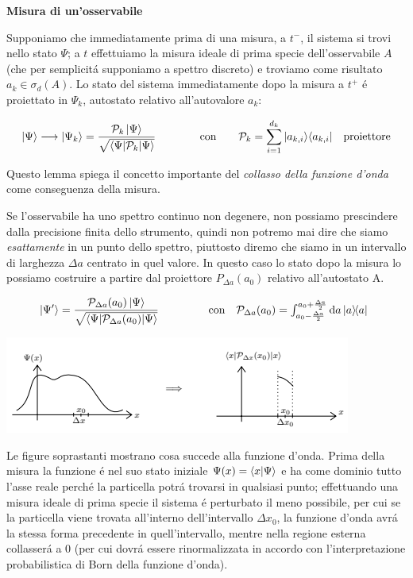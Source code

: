 \begin{postulato} \textbf{Misura di un'osservabile}

Supponiamo che immediatamente prima di una misura, a $t^-$, il sistema si trovi nello stato $\Psi$; a $t$ effettuiamo la misura ideale di prima specie dell'osservabile $A$ (che per semplicit\'a supponiamo a spettro discreto) e troviamo come risultato $a_k \in \sigma_{d}(A)$. Lo stato del sistema immediatamente dopo la misura a $t^+$ \'e proiettato in $\Psi_k$, autostato relativo all'autovalore $a_k$:

$$|\Psi\rangle\longrightarrow|\Psi_{k}\rangle=\frac{{\mathcal{P}}_{k}\,|\Psi\rangle}{\sqrt{\left\langle\Psi|{\mathcal{P}}_{k}|\Psi\right\rangle}} \qquad\qquad \text{con} \qquad \mathcal{P}_k = \sum_{i=1}^{d_k} \ket{a_{k,i}} \bra{a_{k,i}} \quad \text{proiettore}$$
\end{postulato}

Questo lemma spiega il concetto importante del \textit{collasso della funzione d'onda} come conseguenza della misura.

Se l'osservabile ha uno spettro continuo non degenere, non possiamo prescindere dalla precisione finita dello strumento, quindi non potremo mai dire che siamo \textit{esattamente} in un punto dello spettro, piuttosto diremo che siamo in un intervallo di larghezza $\Delta a$ centrato in quel valore. In questo caso lo stato dopo la misura lo possiamo costruire a partire dal proiettore $P_{\Delta a}(a_0)$ relativo all'autostato A.

$$\ket{\Psi^\prime} = \frac{{\mathcal{P}}_{\Delta a}(a_{0})\,|\Psi\rangle}{\sqrt{\left\langle\Psi|{\mathcal{P}}_{\Delta a}(a_{0})|\Psi\right\rangle}} \qquad\qquad \begin{array}{r l}\text{con}&{{}{\mathcal{P}}_{\Delta a}(a_{0})=\int_{a_{0}-{\frac{\Delta a}{2}}}^{a_{0}+{\frac{\Delta a}{2}}}\mathrm{d}a\,|a\rangle\!\langle a|}\end{array}$$
	
\begin{center}
	\includegraphics{immagini/19_image_2.png}
\end{center}
	
Le figure soprastanti mostrano cosa succede alla funzione d'onda. Prima della misura la funzione \'e nel suo stato iniziale $\Psi(x) = \braket{x}{\Psi}$ e ha come dominio tutto l'asse reale perch\'e la particella potr\'a trovarsi in qualsiasi punto; effettuando una misura ideale di prima specie il sistema \'e perturbato il meno possibile, per cui se la particella viene trovata all'interno dell'intervallo $\Delta x_0$, la funzione d'onda avr\'a la stessa forma precedente in quell'intervallo, mentre nella regione esterna collasser\'a a 0 (per cui dovr\'a essere rinormalizzata in accordo con l'interpretazione probabilistica di Born della funzione d'onda).
	

